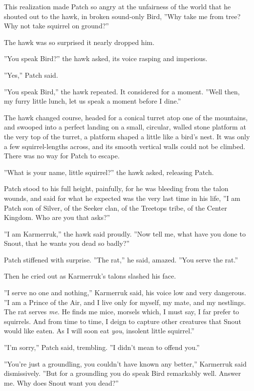 \documentclass[11pt]{article}
\begin{document}
This realization made Patch so angry at the unfairness of the world that he shouted out to the hawk, in broken sound-only Bird, ''Why take me from tree? Why not take squirrel on ground?''\par
 The hawk was so surprised it nearly dropped him.\par
''You speak Bird?'' the hawk asked, its voice rasping and imperious.\par
 ''Yes,'' Patch said.\par
 ''You speak Bird,'' the hawk repeated. It considered for a moment. ''Well then, my furry little lunch, let us speak a moment before I dine.''\par
 The hawk changed course, headed for a conical turret atop one of the mountains, and swooped into a perfect landing on a small, circular, walled stone platform at the very top of the turret, a platform shaped a little like a bird's nest. It was only a few squirrel-lengths across, and its smooth vertical walls could not be climbed. There was no way for Patch to escape.\par
 ''What is your name, little squirrel?'' the hawk asked, releasing Patch.\par
 Patch stood to his full height, painfully, for he was bleeding from the talon wounds, and said for what he expected was the very last time in his life, ''I am Patch son of Silver, of the Seeker clan, of the Treetops tribe, of the Center Kingdom. Who are you that asks?''\par
 ''I am Karmerruk,'' the hawk said proudly. ''Now tell me, what have you done to Snout, that he wants you dead so badly?''\par
 Patch stiffened with surprise. ''The rat,'' he said, amazed. ''You serve the rat.''\par
 Then he cried out as Karmerruk's talons slashed his face.\par
 ''I serve no one and nothing,'' Karmerruk said, his voice low and very dangerous. ''I am a Prince of the Air, and I live only for myself, my mate, and my nestlings. The rat serves {\it me}. He finds me mice, morsels which, I must say, I far prefer to squirrels. And from time to time, I deign to capture other creatures that Snout would like eaten. As I will soon eat {\it you}, insolent little squirrel.''\par
 ''I'm sorry,'' Patch said, trembling. ''I didn't mean to offend you.''\par
 ''You're just a groundling, you couldn't have known any better,'' Karmerruk said dismissively. ''But for a groundling you do speak Bird remarkably well. Answer me. Why does Snout want you dead?''\par
\end{document}
